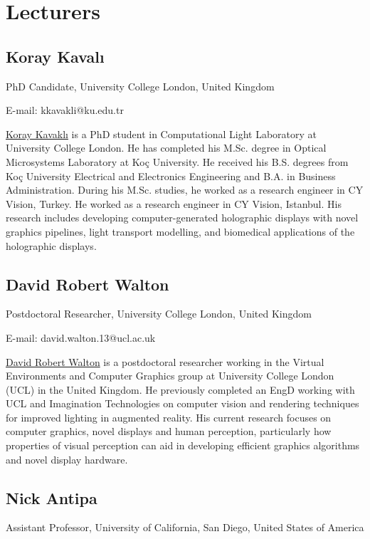 \chapter*{Lecturers}

\section*{Koray Kavalı}
PhD Candidate,
University College London,
United Kingdom

E-mail: kkavakli@ku.edu.tr

\href{https://scholar.google.com/citations?user=rn6XtO4AAAAJ&hl=en&oi=ao}{Koray Kavaklı} is a PhD student in Computational Light Laboratory at University College London.
He has completed his M.Sc. degree in Optical Microsystems Laboratory at Koç University.
He received his B.S. degrees from Koç University Electrical and Electronics Engineering and B.A. in Business Administration.
During his M.Sc. studies, he worked as a research engineer in CY Vision, Turkey. He worked as a research engineer in CY Vision, Istanbul.
His research includes developing computer-generated holographic displays with novel graphics pipelines, light transport modelling, and biomedical applications of the holographic displays.

\section*{David Robert Walton}
Postdoctoral Researcher, 
University College London,
United Kingdom

E-mail: david.walton.13@ucl.ac.uk

\href{https://drwalton.github.io/}{David Robert Walton} is a postdoctoral researcher working in the Virtual Environments and Computer Graphics group at University College London (UCL) in the United Kingdom. He previously completed an EngD working with UCL and Imagination Technologies on computer vision and rendering techniques for improved lighting in augmented reality. His current research focuses on computer graphics, novel displays and human perception, particularly how properties of visual perception can aid in developing efficient graphics algorithms and novel display hardware.


\section*{Nick Antipa}
Assistant Professor,
University of California, San Diego, United States of America

